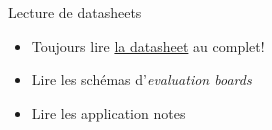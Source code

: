 \begin{frame}{Lecture de datasheets}
        \leftcol
        \begin{itemize}
            \item<1-> Toujours lire \href{https://ww1.microchip.com/downloads/aemDocuments/documents/APID/ProductDocuments/DataSheets/MCP3561_2_4R-Data-Sheet-DS200006391C.pdf}{la datasheet} au complet!
            \item<2-> Lire les schémas d'\textit{evaluation boards}
            \item<3-> Lire les application notes
        \end{itemize}


\end{frame}
